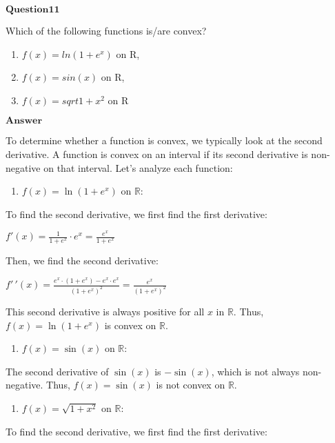 \documentclass[11pt]{article}
\providecommand{\tightlist}{%
      \setlength{\itemsep}{0pt}\setlength{\parskip}{0pt}}
\begin{document}
    $\textbf{Question11}$

Which of the following functions is/are convex?

\begin{enumerate}
\def\labelenumi{(\alph{enumi})}
\item
  $f(x)=ln(1+e^x)$ on R,
\item
  $f(x)=sin(x)$ on R,
\item
  $f(x)=sqrt{1+x^2}$ on R
\end{enumerate}

$\textbf{Answer}$

    To determine whether a function is convex, we typically look at the
second derivative. A function is convex on an interval if its second
derivative is non-negative on that interval. Let's analyze each
function:

\begin{enumerate}
\def\labelenumi{(\alph{enumi})}
\tightlist
\item
  $ f(x) = \ln(1+e^x) $ on $ \mathbb{R} $:
\end{enumerate}

To find the second derivative, we first find the first derivative:

$ f'(x) = \frac{1}{1 + e^x} \cdot e^x = \frac{e^x}{1 + e^x} $

Then, we find the second derivative:

$ f'\,'(x) = \frac{e^x \cdot (1 + e^x) - e^x \cdot e^x}{(1 + e^x)^2} =
\frac{e^x}{(1 + e^x)^2} $

This second derivative is always positive for all $ x $ in $
\mathbb{R} $. Thus, $ f(x) = \ln(1+e^x) $ is convex on $
\mathbb{R} $.

\begin{enumerate}
\def\labelenumi{(\alph{enumi})}
\setcounter{enumi}{1}
\tightlist
\item
  $ f(x) = \sin(x) $ on $ \mathbb{R} $:
\end{enumerate}

The second derivative of $ \sin(x) $ is $ -\sin(x) $, which is not
always non-negative. Thus, $ f(x) = \sin(x) $ is not convex on $
\mathbb{R} $.

\begin{enumerate}
\def\labelenumi{(\alph{enumi})}
\setcounter{enumi}{2}
\tightlist
\item
  $ f(x) = \sqrt{1+x^2} $ on $ \mathbb{R} $:
\end{enumerate}

To find the second derivative, we first find the first derivative:
\end{document}
